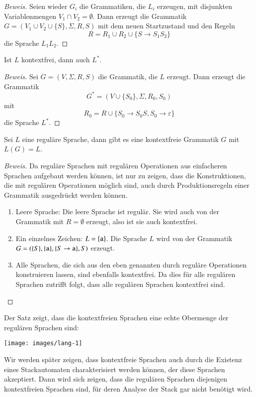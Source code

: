 \begin{proof}[Beweis]
Seien wieder $G_i$ die Grammatiken, die $L_i$ erzeugen, mit disjunkten
Variablenmengen $V_1\cap V_2=\emptyset$. Dann erzeugt die Grammatik
$G=(V_1\cup V_2\cup\{S\},\Sigma, R,S)$ mit dem neuen Startzustand
und den Regeln
\[
R=R_1\cup R_2\cup \{S\to S_1S_2\}
\]
die Sprache $L_1L_2$.
\end{proof}

\begin{satz}[$*$-Operation]
%
\label{satz:cfg-star}
Ist $L$ kontextfrei, dann auch $L^*$.
\end{satz}

\begin{proof}[Beweis]
Sei $G=(V,\Sigma,R,S)$ die Grammatik, die $L$ erzeugt. Dann erzeugt die
Grammatik
\[
G^*=(V\cup \{S_0\}, \Sigma, R_0, S_0)
\]
mit
\[
R_0=R\cup \{ S_0\to S_0S, S_0\to\varepsilon \}
\]
die Sprache $L^*$.
\end{proof}

\begin{satz} Sei $L$ eine reguläre Sprache, dann gibt es eine
kontextfreie Grammatik $G$ mit $L(G)=L$.
\end{satz}

\begin{proof}[Beweis]
Da reguläre Sprachen mit regulären Operationen aus einfacheren
Sprachen aufgebaut werden können, ist nur zu zeigen, dass die
Konstruktionen, die mit regulären Operationen möglich sind,
auch durch Produktionsregeln einer Grammatik ausgedrückt werden
können. 
\begin{enumerate}
\item Leere Sprache: Die leere Sprache ist regulär. Sie wird auch 
von der Grammatik mit $R=\emptyset$ erzeugt, also ist sie auch
kontextfrei.
\item Ein einzelnes Zeichen: $L=\{{\tt a}\}$. Die Sprache $L$ wird von
der Grammatik $G=(\{S\}, \{{\tt a}\}, \{S\to{\tt a}\}, S)$
erzeugt.
\item Alle Sprachen, die sich aus den eben genannten durch reguläre
Operationen konstruieren lassen, sind ebenfalls kontextfrei. Da
dies für alle regulären Sprachen zutrifft folgt, dass alle
regulären Sprachen kontextfrei sind.
\end{enumerate}
\end{proof}

Der Satz zeigt, dass die kontextfreien Sprachen eine echte
Obermenge der regulären Sprachen sind:
\begin{center}
\texttt{[image: images/lang-1]}
\end{center}
Wir werden später zeigen, dass kontextfreie Sprachen auch durch
die Existenz eines Stackautomaten charakterisiert werden können,
der diese Sprachen akzeptiert. Dann wird sich zeigen, dass 
die regulären Sprachen diejenigen kontextfreien Sprachen sind,
für deren Analyse der Stack gar nicht benötigt wird.

